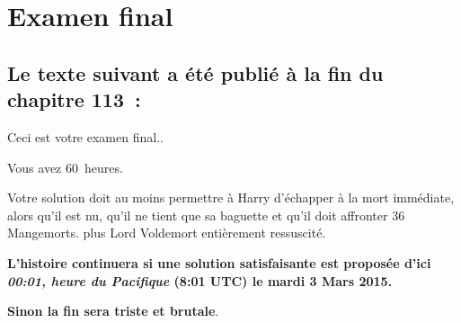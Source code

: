 \chapter*{Examen final}

\section{Le texte suivant a été publié à la fin du chapitre 113~:}


\setlength{\parskip}{.5\baselineskip}

Ceci est votre examen final..

Vous avez 60~heures.

Votre solution doit au moins permettre à Harry d'échapper à la mort immédiate,
alors qu'il est nu, qu'il ne tient que sa baguette et qu'il doit affronter 36 Mangemorts.
plus Lord Voldemort entièrement ressuscité.

\textbf{L'histoire continuera si une solution satisfaisante est proposée d'ici \emph{00:01, heure du Pacifique} (8:01 UTC) le mardi 3 Mars 2015.} 

\textbf{Sinon la fin sera triste et brutale}.

